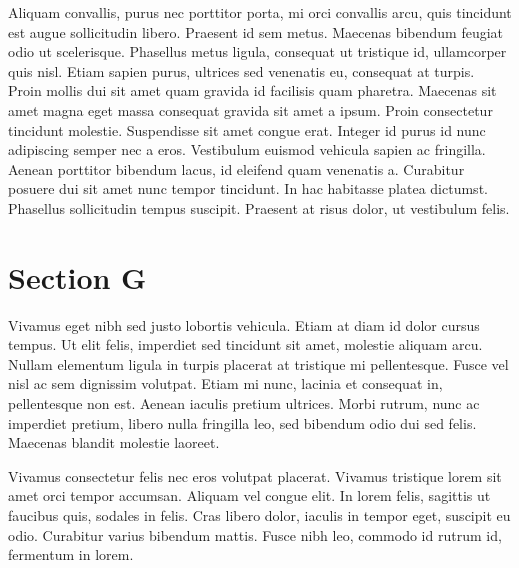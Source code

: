 Aliquam convallis, purus nec porttitor porta, mi orci convallis arcu, quis tincidunt est augue sollicitudin libero. Praesent id sem metus. Maecenas bibendum feugiat odio ut scelerisque. Phasellus metus ligula, consequat ut tristique id, ullamcorper quis nisl. Etiam sapien purus, ultrices sed venenatis eu, consequat at turpis. Proin mollis dui sit amet quam gravida id facilisis quam pharetra. Maecenas sit amet magna eget massa consequat gravida sit amet a ipsum. Proin consectetur tincidunt molestie. Suspendisse sit amet congue erat. Integer id purus id nunc adipiscing semper nec a eros. Vestibulum euismod vehicula sapien ac fringilla. Aenean porttitor bibendum lacus, id eleifend quam venenatis a. Curabitur posuere dui sit amet nunc tempor tincidunt. In hac habitasse platea dictumst. Phasellus sollicitudin tempus suscipit. Praesent at risus dolor, ut vestibulum felis.
\cite{book_a}

\section{Section G}
Vivamus eget nibh sed justo lobortis vehicula. Etiam at diam id dolor cursus tempus. Ut elit felis, imperdiet sed tincidunt sit amet, molestie aliquam arcu. Nullam elementum ligula in turpis placerat at tristique mi pellentesque. Fusce vel nisl ac sem dignissim volutpat. Etiam mi nunc, lacinia et consequat in, pellentesque non est. Aenean iaculis pretium ultrices. Morbi rutrum, nunc ac imperdiet pretium, libero nulla fringilla leo, sed bibendum odio dui sed felis. Maecenas blandit molestie laoreet.

Vivamus consectetur felis nec eros volutpat placerat. Vivamus tristique lorem sit amet orci tempor accumsan. Aliquam vel congue elit. In lorem felis, sagittis ut faucibus quis, sodales in felis. Cras libero dolor, iaculis in tempor eget, suscipit eu odio. Curabitur varius bibendum mattis. Fusce nibh leo, commodo id rutrum id, fermentum in lorem.
\cite{book_b} 